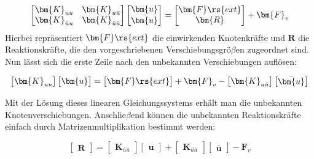 \begin{equation}
\label{LGSsolve1}
\begin{bmatrix}
\bm{K}_{uu} & \bm{K}_{u\bar{u}} \\
\bm{K}_{\bar{u}u} & \bm{K}_{\bar{u}\bar{u}}
\end{bmatrix}
\begin{bmatrix}
\bm{u} \\
\bar{\bm{u}}
\end{bmatrix} = \begin{bmatrix} \bm{F}\rs{ext} \\ \bm{R} \end{bmatrix} + \bm{F}_v
\end{equation}
Hierbei repräsentiert $\bm{F}\rs{ext}$ die einwirkenden Knotenkräfte und $\bm{R}$ die Reaktionskräfte, die den vorgeschriebenen Verschiebungsgrö$\beta$en zugeordnet sind. Nun lässt sich die erste Zeile nach den unbekannten Verschiebungen auflösen:

\begin{equation}
\label{LGSsolve2}
\begin{bmatrix}
\bm{K}_{uu}
\end{bmatrix}
\begin{bmatrix}
\bm{u}
\end{bmatrix} = \begin{bmatrix} \bm{F}\rs{ext}\end{bmatrix} + \bm{F}_v - \begin{bmatrix}
\bm{K}_{u\bar{u}} 
\end{bmatrix} \begin{bmatrix}
\bar{\bm{u}}
\end{bmatrix}
\end{equation}

Mit der Lösung dieses linearen Gleichungssystems erhält man die unbekannten Knotenverschiebungen. Anschlie$\beta$end können die unbekannten Reaktionskräfte einfach durch Matrizenmultiplikation bestimmt werden:

\begin{equation}
\label{LGSsolve3}
\begin{bmatrix} \bm{R} \end{bmatrix} = 
\begin{bmatrix}
\bm{K}_{\bar{u}u}
\end{bmatrix}
\begin{bmatrix}
\bm{u}
\end{bmatrix} + \begin{bmatrix}
\bm{K}_{\bar{u}\bar{u}} 
\end{bmatrix} \begin{bmatrix}
\bar{\bm{u}}
\end{bmatrix}- \bm{F}_v
\end{equation}

